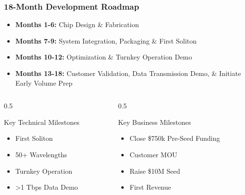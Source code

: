 \documentclass{beamer}
\begin{document}
\begin{frame}
    \frametitle{18-Month Development Roadmap}
    
    \begin{itemize}
        \item \textbf{Months 1-6:} Chip Design \& Fabrication
        \item \textbf{Months 7-9:} System Integration, Packaging \& First Soliton
        \item \textbf{Months 10-12:} Optimization \& Turnkey Operation Demo
        \item \textbf{Months 13-18:} Customer Validation, Data Transmission Demo, \& Initiate Early Volume Prep
    \end{itemize}
    
    \begin{columns}[T]
        \begin{column}{0.5\textwidth}
            \begin{exampleblock}{Key Technical Milestones}
                \begin{itemize}
                    \item[M6:] First Soliton
                    \item[M9:] 50+ Wavelengths
                    \item[M12:] Turnkey Operation
                    \item[M15:] >1 Tbps Data Demo
                \end{itemize}
            \end{exampleblock}
        \end{column}
        \begin{column}{0.5\textwidth}
            \begin{block}{Key Business Milestones}
                \begin{itemize}
                    \item[M3:] Close \$750k Pre-Seed Funding
                    \item[M12:] Customer MOU
                    \item[M18:] Raise \$10M Seed
                    \item[M24:] First Revenue
                \end{itemize}
            \end{block}
        \end{column}
    \end{columns}
\end{frame}
\end{document}
